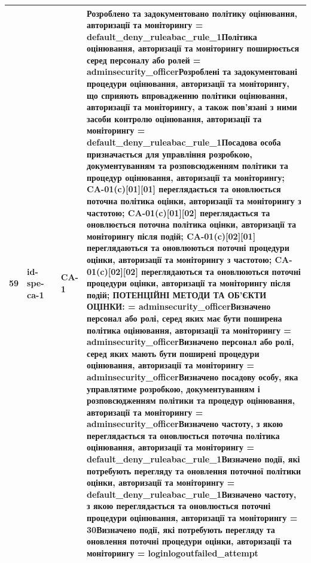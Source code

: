 \documentclass[10pt]{article}
\begin{document}
\begin{longtable}{|c|>{\raggedright\arraybackslash}p{4cm}|>{\raggedright\arraybackslash}p{2.5cm}|>{\raggedright\arraybackslash}p{3.5cm}|>{\raggedright\arraybackslash}p{5.5cm}|}
59 & id-spe-ca-1 &  & CA-1 & Розроблено та задокументовано політику оцінювання, авторизації та моніторингу = \textbf{default\_\allowbreak{}deny\_\allowbreak{}ruleabac\_\allowbreak{}rule\_\allowbreak{}1}\newline Політика оцінювання, авторизації та моніторингу поширюється серед персоналу або ролей = \textbf{adminsecurity\_\allowbreak{}officer}\newline Розроблені та задокументовані процедури оцінювання, авторизації та моніторингу, що сприяють впровадженню політики оцінювання, авторизації та моніторингу, а також пов'язані з ними засоби контролю оцінювання, авторизації та моніторингу = \textbf{default\_\allowbreak{}deny\_\allowbreak{}ruleabac\_\allowbreak{}rule\_\allowbreak{}1}\newline Посадова особа призначається для управління розробкою, документуванням та розповсюдженням політики та процедур оцінювання, авторизації та моніторингу; CA-01(c)[01][01] переглядається та оновлюється поточна політика оцінки, авторизації та моніторингу з частотою; CA-01(c)[01][02] переглядається та оновлюється поточна політика оцінки, авторизації та моніторингу після подій; CA-01(c)[02][01] переглядаються та оновлюються поточні процедури оцінки, авторизації та моніторингу з частотою; CA-01(c)[02][02] переглядаються та оновлюються поточні процедури оцінки, авторизації та моніторингу після подій; ПОТЕНЦІЙНІ МЕТОДИ ТА ОБ'ЄКТИ ОЦІНКИ: = \textbf{adminsecurity\_\allowbreak{}officer}\newline Визначено персонал або ролі, серед яких має бути поширена політика оцінювання, авторизації та моніторингу = \textbf{adminsecurity\_\allowbreak{}officer}\newline Визначено персонал або ролі, серед яких мають бути поширені процедури оцінювання, авторизації та моніторингу = \textbf{adminsecurity\_\allowbreak{}officer}\newline Визначено посадову особу, яка управлятиме розробкою, документуванням і розповсюдженням політики та процедур оцінювання, авторизації та моніторингу = \textbf{adminsecurity\_\allowbreak{}officer}\newline Визначено частоту, з якою переглядається та оновлюється поточна політика оцінювання, авторизації та моніторингу = \textbf{default\_\allowbreak{}deny\_\allowbreak{}ruleabac\_\allowbreak{}rule\_\allowbreak{}1}\newline Визначено події, які потребують перегляду та оновлення поточної політики оцінки, авторизації та моніторингу = \textbf{default\_\allowbreak{}deny\_\allowbreak{}ruleabac\_\allowbreak{}rule\_\allowbreak{}1}\newline Визначено частоту, з якою переглядається та оновлюється поточні процедури оцінювання, авторизації та моніторингу = \textbf{30}\newline Визначено події, які потребують перегляду та оновлення поточні процедури оцінки, авторизації та моніторингу = \textbf{loginlogoutfailed\_\allowbreak{}attempt} \\ \hline

\end{longtable}
\end{document}
